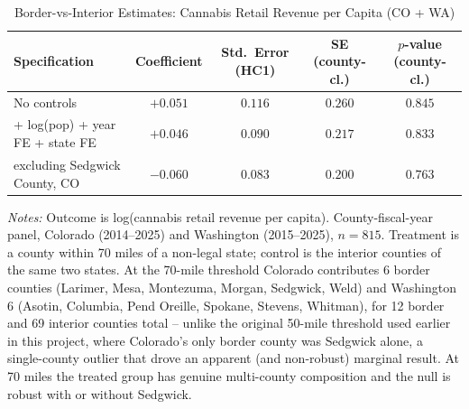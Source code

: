 \begin{table}[htbp]
\centering
\caption{Border-vs-Interior Estimates: Cannabis Retail Revenue per Capita (CO + WA)}
\label{tab:revenue_border70}
\begin{tabular}{lcccc}
\toprule
Specification & Coefficient & Std.\ Error (HC1) & SE (county-cl.) & $p$-value (county-cl.) \\
\midrule
No controls & $+0.051$ & $0.116$ & $0.260$ & $0.845$ \\
+ log(pop) + year FE + state FE & $+0.046$ & $0.090$ & $0.217$ & $0.833$ \\
\quad excluding Sedgwick County, CO & $-0.060$ & $0.083$ & $0.200$ & $0.763$ \\
\bottomrule
\end{tabular}
\begin{minipage}{0.95\textwidth}
\vspace{0.3em}
\footnotesize
\textit{Notes:} Outcome is log(cannabis retail revenue per capita). County-fiscal-year panel, Colorado
(2014--2025) and Washington (2015--2025), $n=815$. Treatment is a county within 70 miles of a non-legal
state; control is the interior counties of the same two states. At the 70-mile threshold Colorado
contributes 6 border counties (Larimer, Mesa, Montezuma, Morgan, Sedgwick, Weld) and Washington 6
(Asotin, Columbia, Pend Oreille, Spokane, Stevens, Whitman), for 12 border and 69 interior counties total
-- unlike the original 50-mile threshold used earlier in this project, where Colorado's only border
county was Sedgwick alone, a single-county outlier that drove an apparent (and non-robust) marginal
result. At 70 miles the treated group has genuine multi-county composition and the null is robust with or
without Sedgwick.
\end{minipage}
\end{table}
